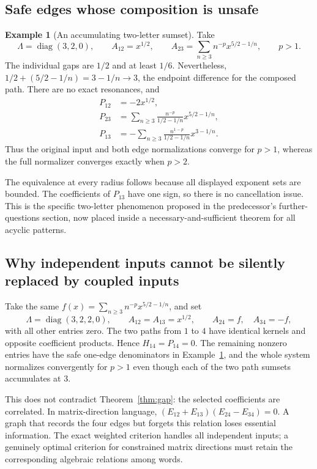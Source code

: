 \documentclass[11pt,a4paper]{article}
\numberwithin{equation}{section}
\theoremstyle{definition}
\newtheorem{example}[theorem]{Example}
\theoremstyle{remark}
\newcommand{\diag}{\operatorname{diag}}
\begin{document}
\subsection{Safe edges whose composition is unsafe}
\begin{example}[An accumulating two-letter sumset]\label{ex:hidden}
Take
\[
 \Lambda=\diag(3,2,0),\qquad A_{12}=x^{1/2},\qquad
 A_{23}=\sum_{n\geq3}n^{-p}x^{5/2-1/n},\qquad p>1.
\]
The individual gaps are $1/2$ and at least $1/6$. Nevertheless,
$1/2+(5/2-1/n)=3-1/n\to3$, the endpoint difference for the composed path.
There are no exact resonances, and
\begin{align}
 P_{12}&=-2x^{1/2},\nonumber\\
 P_{23}&=\sum_{n\geq3}\frac{n^{-p}}{1/2-1/n}x^{5/2-1/n},\label{eq:hidden}\\
 P_{13}&=-\sum_{n\geq3}\frac{n^{1-p}}{1/2-1/n}x^{3-1/n}.\nonumber
\end{align}
Thus the original input and both edge normalizations converge for $p>1$,
whereas the full normalizer converges exactly when $p>2$.
\end{example}

The equivalence at every radius follows because all displayed exponent
sets are bounded. The coefficients of $P_{13}$ have one sign, so there is
no cancellation issue. This is the specific two-letter phenomenon proposed
in the predecessor's further-questions section, now placed inside a
necessary-and-sufficient theorem for all acyclic patterns.

\subsection{Why independent inputs cannot be silently replaced by coupled inputs}
\label{sec:cancellation}
Take the same $f(x)=\sum_{n\geq3}n^{-p}x^{5/2-1/n}$, and set
\[
 \Lambda=\diag(3,2,2,0),\qquad
 A_{12}=A_{13}=x^{1/2},\qquad A_{24}=f,\quad A_{34}=-f,
\]
with all other entries zero. The two paths from $1$ to $4$ have identical
kernels and opposite coefficient products. Hence $H_{14}=P_{14}=0$.
The remaining nonzero entries have the safe one-edge denominators in
Example~\ref{ex:hidden}, and the whole system normalizes convergently for
$p>1$ even though each of the two path sumsets accumulates at $3$.

This does not contradict Theorem~\ref{thm:gap}: the selected coefficients
are correlated. In matrix-direction language,
$(E_{12}+E_{13})(E_{24}-E_{34})=0$. A graph that records the four edges
but forgets this relation loses essential information. The exact weighted
criterion handles all independent inputs; a genuinely optimal criterion
for constrained matrix directions must retain the corresponding algebraic
relations among words.
\end{document}
